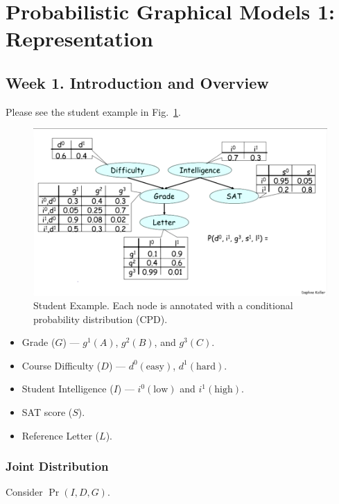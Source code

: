 \documentclass[12pt]{article}
\begin{document}
\section{Probabilistic Graphical Models 1: Representation}

\subsection{Week 1. Introduction and Overview}

Please see the student example in Fig.~\ref{fig:student_example}.

\begin{figure}[H]
\centering
\includegraphics[width=6in]{graphics/student_example.png}
\caption{Student Example. Each node is annotated with a conditional probability distribution (CPD).}
\label{fig:student_example}
\end{figure}


\begin{itemize}
    \item Grade ($G$) --- $g^1(A)$, $g^2(B)$, and $g^3(C)$.
    \item Course Difficulty ($D$) --- $d^0(\text{easy})$, $d^1(\text{hard})$.
    \item Student Intelligence ($I$) --- $i^0(\text{low})$ and $i^1(\text{high})$.
    \item SAT score ($S$).
    \item Reference Letter ($L$).
\end{itemize}
 



\subsubsection{Joint Distribution}
Consider $\Pr(I, D, G)$.
\end{document}
